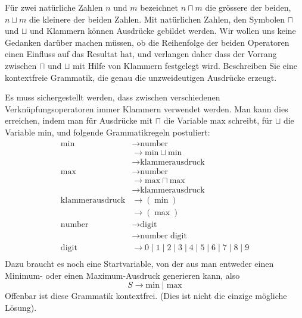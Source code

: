 Für zwei natürliche Zahlen $n$ und $m$ bezeichnet $n\sqcap m$ die
grössere der beiden, $n\sqcup m$ die kleinere der beiden Zahlen.
Mit natürlichen Zahlen, den Symbolen $\sqcap$ und $\sqcup$ und Klammern
können Ausdrücke gebildet werden.
Wir wollen uns keine Gedanken darüber machen müssen, ob die Reihenfolge
der beiden Operatoren einen Einfluss auf das Resultat hat, und
verlangen daher
dass der Vorrang zwischen $\sqcap$ und $\sqcup$ mit Hilfe
von Klammern festgelegt wird. Beschreiben Sie eine
kontextfreie Grammatik, die genau die unzweideutigen Ausdrücke
erzeugt.


\begin{loesung}
Es muss sichergestellt werden, dass zwischen verschiedenen
Verknüpfungsoperatoren immer Klammern verwendet werden. Man kann
dies erreichen, indem man für Ausdrücke mit $\sqcap$ die Variable
$\text{max}$ schreibt, für $\sqcup$ die Variable $\text{min}$, und
folgende Grammatikregeln postuliert:
\begin{align*}
\text{min}&\rightarrow \text{number}\\
&\rightarrow \text{min}\sqcup \text{min}\\
&\rightarrow\text{klammerausdruck}\\
\text{max}&\rightarrow \text{number}\\
&\rightarrow \text{max}\sqcap \text{max}\\
&\rightarrow\text{klammerausdruck}\\
\text{klammerausdruck}&\rightarrow (\;\text{min}\;)\\
&\rightarrow (\;\text{max}\;)\\
\text{number}&\rightarrow\text{digit}\\
&\rightarrow\text{number}\;\text{digit}\\
\text{digit}&\rightarrow 0
\;|\;1
\;|\;2
\;|\;3
\;|\;4
\;|\;5
\;|\;6
\;|\;7
\;|\;8
\;|\;9
\\
\end{align*}
Dazu braucht es noch eine Startvariable, von der aus man entweder einen
Minimum- oder einen Maximum-Ausdruck generieren kann, also
$$S\rightarrow \text{min}\;|\;\text{max}$$
Offenbar ist diese Grammatik kontextfrei.
(Dies ist nicht die einzige mögliche Lösung).
\end{loesung}
